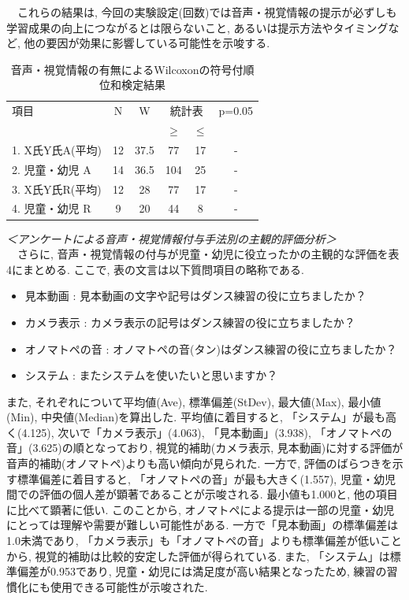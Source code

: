 \documentclass[technicalreport]{ieicej}
\begin{document}
　これらの結果は, 今回の実験設定(回数)では音声・視覚情報の提示が必ずしも学習成果の向上につながるとは限らないこと, あるいは提示方法やタイミングなど, 他の要因が効果に影響している可能性を示唆する. \\
\begin{table}[t]
  \centering
  \caption{音声・視覚情報の有無によるWilcoxonの符号付順位和検定結果}
  \begin{tabularx}{\linewidth}{X c c c c c}
    \toprule
      項目 & N & W & \multicolumn{2}{c}{統計表} & p=0.05 \\
    \cmidrule(lr){4-5}
      & & & $\geq$ & $\leq$ & \\
    \midrule
      1. X氏Y氏A(平均) & 12 & 37.5 & 77 & 17 & - \\
      2. 児童・幼児 A & 14 & 36.5 & 104 & 25 & - \\
      3. X氏Y氏R(平均) & 12 & 28 & 77 & 17 & - \\
      4. 児童・幼児 R & 9 & 20 & 44 & 8 & - \\
    \bottomrule
  \end{tabularx}
\end{table}
\textit{＜アンケートによる音声・視覚情報付与手法別の主観的評価分析＞}\\
　さらに, 音声・視覚情報の付与が児童・幼児に役立ったかの主観的な評価を表4にまとめる. ここで, 表の文言は以下質問項目の略称である. 
\begin{itemize}[nosep]
  \item 見本動画 : 見本動画の文字や記号はダンス練習の役に立ちましたか？
  \item カメラ表示 : カメラ表示の記号はダンス練習の役に立ちましたか？
  \item オノマトペの音 : オノマトペの音(タン)はダンス練習の役に立ちましたか？
  \item システム : またシステムを使いたいと思いますか？
\end{itemize}
また, それぞれについて平均値(Ave), 標準偏差(StDev), 最大値(Max), 最小値(Min), 中央値(Median)を算出した. 平均値に着目すると, 「システム」が最も高く(4.125), 次いで「カメラ表示」(4.063), 「見本動画」(3.938), 「オノマトペの音」(3.625)の順となっており, 視覚的補助(カメラ表示, 見本動画)に対する評価が音声的補助(オノマトペ)よりも高い傾向が見られた. 一方で, 評価のばらつきを示す標準偏差に着目すると, 「オノマトペの音」が最も大きく(1.557), 児童・幼児間での評価の個人差が顕著であることが示唆される. 最小値も1.000と, 他の項目に比べて顕著に低い. このことから, オノマトペによる提示は一部の児童・幼児にとっては理解や需要が難しい可能性がある. 一方で「見本動画」の標準偏差は1.0未満であり, 「カメラ表示」も「オノマトペの音」よりも標準偏差が低いことから, 視覚的補助は比較的安定した評価が得られている. また, 「システム」は標準偏差が0.953であり, 児童・幼児には満足度が高い結果となったため, 練習の習慣化にも使用できる可能性が示唆された. \\
\end{document}

